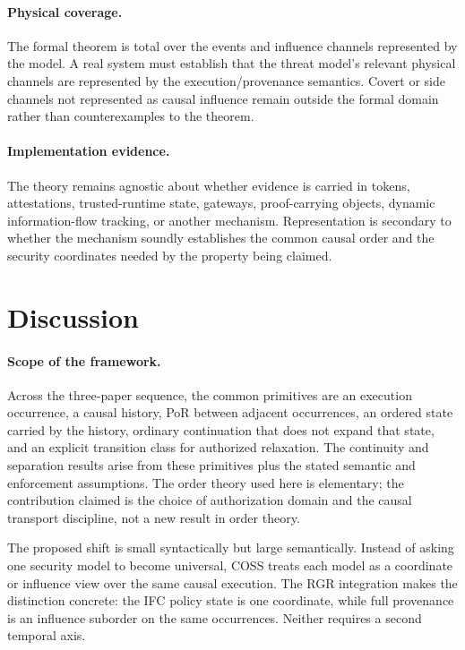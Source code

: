 \documentclass[10pt,twocolumn]{article}
\newcommand{\Model}{\textnormal{\textsc{COSS}}\xspace}
\begin{document}
\paragraph{Physical coverage.}
The formal theorem is total over the events and influence channels represented
by the model. A real system must establish that the threat model's relevant
physical channels are represented by the execution/provenance semantics.
Covert or side channels not represented as causal influence remain outside the
formal domain rather than counterexamples to the theorem.

\paragraph{Implementation evidence.}
The theory remains agnostic about whether evidence is carried in tokens,
attestations, trusted-runtime state, gateways, proof-carrying objects, dynamic
information-flow tracking, or another mechanism. Representation is secondary
to whether the mechanism soundly establishes the common causal order and the
security coordinates needed by the property being claimed.

\section{Discussion}

\paragraph{Scope of the framework.}
Across the three-paper sequence, the common primitives are an execution
occurrence, a causal history, PoR between adjacent occurrences, an ordered
state carried by the history, ordinary continuation that does not expand that
state, and an explicit transition class for authorized relaxation.  The
continuity and separation results arise from these primitives plus the stated
semantic and enforcement assumptions.  The order theory used here is
elementary; the contribution claimed is the choice of authorization domain and
the causal transport discipline, not a new result in order theory.

The proposed shift is small syntactically but large semantically. Instead of
asking one security model to become universal, \Model treats each model as a
coordinate or influence view over the same causal execution. The RGR
integration makes the distinction concrete: the IFC policy state is one
coordinate, while full provenance is an influence suborder on the same
occurrences. Neither requires a second temporal axis.
\end{document}
